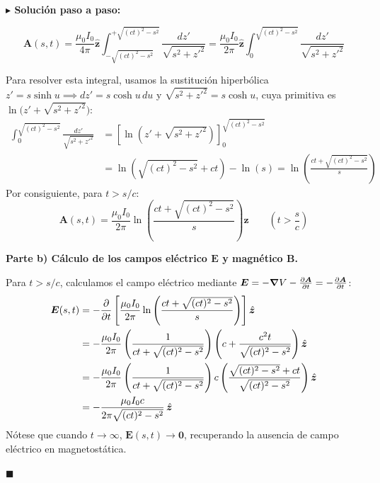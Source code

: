 \documentclass[11pt,a4paper]{book}
\newenvironment{solucion}{%
    \par\medskip\noindent\textbf{\color{blue!65!black}\Large $\blacktriangleright$ Solución paso a paso:}\par\medskip
}{%
    \hfill$\blacksquare$\par\bigskip
}
\newcommand{\zhat}{\hat{\bm{z}}}
\newcommand{\Evec}{\bm{E}}
\newcommand{\Bvec}{\bm{B}}
\newcommand{\Avec}{\bm{A}}
\begin{document}
\begin{solucion}
\begin{enumerate}
\begin{equation}
        \Avec(s,t) = \frac{\mu_0 I_0}{4\pi}\zhat \int_{-\sqrt{(ct)^2 - s^2}}^{+\sqrt{(ct)^2 - s^2}} \frac{dz'}{\sqrt{s^2 + z'^2}} = \frac{\mu_0 I_0}{2\pi}\zhat \int_{0}^{\sqrt{(ct)^2 - s^2}} \frac{dz'}{\sqrt{s^2 + z'^2}}
    \end{equation}
\end{enumerate}
Para resolver esta integral, usamos la sustitución hiperbólica $z' = s \sinh u \implies dz' = s \cosh u\,du$ y $\sqrt{s^2 + z'^2} = s \cosh u$, cuya primitiva es $\ln\big(z' + \sqrt{s^2 + z'^2}\big)$:
\begin{align}
    \int_{0}^{\sqrt{(ct)^2 - s^2}} \frac{dz'}{\sqrt{s^2 + z'^2}} &= \left[ \ln\left(z' + \sqrt{s^2 + z'^2}\right) \right]_{0}^{\sqrt{(ct)^2 - s^2}} \nonumber \\
    &= \ln\left( \sqrt{(ct)^2 - s^2} + ct \right) - \ln(s) = \ln\left( \frac{ct + \sqrt{(ct)^2 - s^2}}{s} \right)
\end{align}
Por consiguiente, para $t > s/c$:
\begin{equation}
    \Avec(s,t) = \frac{\mu_0 I_0}{2\pi} \ln\left( \frac{ct + \sqrt{(ct)^2 - s^2}}{s} \right) \zhat \qquad \left(t > \frac{s}{c}\right)
\end{equation}

\medskip
\textbf{Parte b) Cálculo de los campos eléctrico $\Evec$ y magnético $\Bvec$.}

Para $t > s/c$, calculamos el campo eléctrico mediante $\Evec = -\grad V - \pdv{\Avec}{t} = -\pdv{\Avec}{t}$:
\begin{align}
    \Evec(s,t) &= -\pdv{}{t}\left[ \frac{\mu_0 I_0}{2\pi} \ln\left( \frac{ct + \sqrt{(ct)^2 - s^2}}{s} \right) \right] \zhat \nonumber \\
    &= -\frac{\mu_0 I_0}{2\pi} \left( \frac{1}{ct + \sqrt{(ct)^2 - s^2}} \right) \left( c + \frac{c^2 t}{\sqrt{(ct)^2 - s^2}} \right) \zhat \nonumber \\
    &= -\frac{\mu_0 I_0}{2\pi} \left( \frac{1}{ct + \sqrt{(ct)^2 - s^2}} \right) c \left( \frac{\sqrt{(ct)^2 - s^2} + ct}{\sqrt{(ct)^2 - s^2}} \right) \zhat \nonumber \\
    &= -\frac{\mu_0 I_0 c}{2\pi \sqrt{(ct)^2 - s^2}}\,\zhat
\end{align}
Nótese que cuando $t \to \infty$, $\Evec(s,t) \to \bm{0}$, recuperando la ausencia de campo eléctrico en magnetostática.


\end{solucion}
\end{document}
